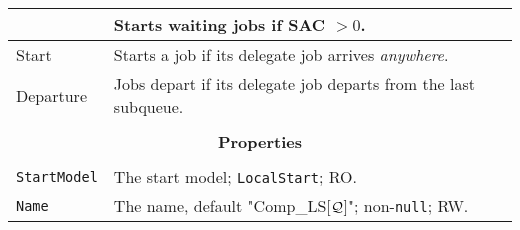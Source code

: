 \begin{tabular}{|l|l|}
	& Starts waiting jobs if SAC $> 0$. \\
	\hline
	Start & Starts a job if its delegate job arrives {\em anywhere}. \\
	\hline
	Departure & Jobs depart if its delegate job departs from the last subqueue. \\
	\hline
	\multicolumn{2}{|c|}{} \\
	\multicolumn{2}{|c|}{\bf Properties} \\
	\multicolumn{2}{|c|}{} \\
	\hline
	\lstinline|StartModel|    & The start model; \lstinline|LocalStart|; RO. \\
	\hline
	\lstinline|Name|          & The name, default "Comp\_LS[${\cal Q}$]"; non-\lstinline|null|; RW. \\
	\hline
\end{tabular}
